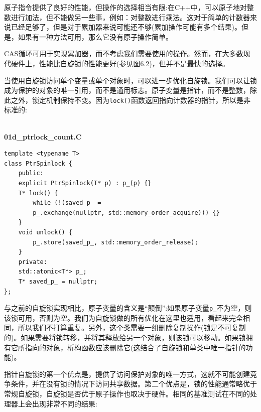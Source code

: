 原子指令提供了良好的性能，但操作的选择相当有限:在C++中，可以原子地对整数进行加法，但不能做另一些事，例如：对整数进行乘法。这对于简单的计数器来说已经足够了，但是对于累加器来说可能还不够(累加操作可能有多个结果)。但是，如果有一种方法可用，那么它没有原子操作简单。

CAS循环可用于实现累加器，而不考虑我们需要使用的操作。然而，在大多数现代硬件上，性能比自旋锁的性能更好(参见图6.2)，但并不是最快的选择。

当使用自旋锁访问单个变量或单个对象时，可以进一步优化自旋锁。我们可以让锁成为保护的对象的唯一引用，而不是通用标志。原子变量是指针，而不是整数，除此之外，锁定机制保持不变。因为\texttt{lock()}函数返回指向计数器的指针，所以是非标准的:

\hspace*{\fill} \\ %
\noindent
\textbf{01d\_ptrlock\_count.C}
\begin{lstlisting}[style=styleCXX]
template <typename T>
class PtrSpinlock {
	public:
	explicit PtrSpinlock(T* p) : p_(p) {}
	T* lock() {
		while (!(saved_p_ =
		p_.exchange(nullptr, std::memory_order_acquire))) {}
	}
	void unlock() {
		p_.store(saved_p_, std::memory_order_release);
	}
	private:
	std::atomic<T*> p_;
	T* saved_p_ = nullptr;
};
\end{lstlisting}

与之前的自旋锁实现相比，原子变量的含义是“颠倒”:如果原子变量\texttt{p\_}不为空，则该锁可用，否则为空。我们为自旋锁做的所有优化在这里也适用，看起来完全相同，所以我们不打算重复。另外，这个类需要一组删除复制操作(锁是不可复制的)。如果需要将锁转移，并将其释放给另一个对象，则该锁可以移动。如果锁拥有它所指向的对象，析构函数应该删除它(这结合了自旋锁和单类中唯一指针的功能)。

指针自旋锁的第一个优点是，提供了访问保护对象的唯一方式，这就不可能创建竞争条件，并在没有锁的情况下访问共享数据。第二个优点是，锁的性能通常略优于常规自旋锁，自旋锁是否优于原子操作也取决于硬件。相同的基准测试在不同的处理器上会出现非常不同的结果:

